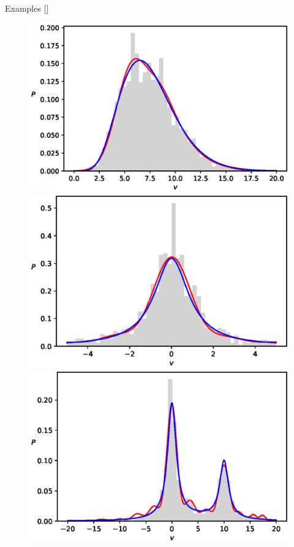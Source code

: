 \documentclass[10pt]{beamer}
\begin{document}
\begin{frame}{Examples \hfill \small [\cite{2020}]}
    \begin{figure}[t!]
        \begin{center}
        \includegraphics[scale=0.30]{figures/GammaDist}
        \includegraphics[scale=0.30]{figures/CauchyDist}
        \includegraphics[scale=0.30]{figures/CauchyMix}

\end{center}
\end{figure}
\end{frame}
\end{document}
